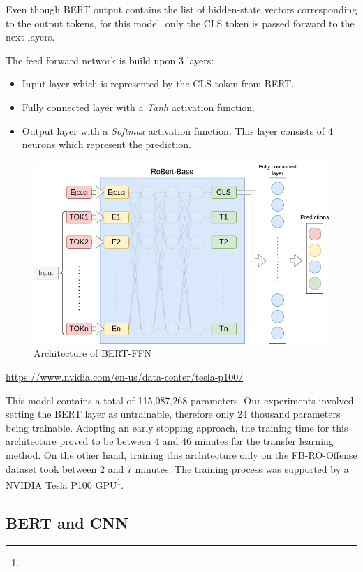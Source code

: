 \documentclass[12pt,a4paper]{report}
\begin{document}
Even though BERT output contains the list of hidden-state vectors corresponding to the output tokens, for this model, only the CLS token is passed forward to the next layers.

The feed forward network is build upon 3 layers:
\begin{itemize}
    \item Input layer which is represented by the CLS token from BERT.
    \item Fully connected layer with a \textit{Tanh} activation function.
    \item Output layer with a \textit{Softmax} activation function. This layer consists of 4 neurons which represent the prediction.
\end{itemize}

\begin{figure}[H]
\centering
\includegraphics[width=15cm]{pics/BERT-FFN.png}
  \caption{Architecture of BERT-FFN}
  \label{fig:BERT-FFN}
\end{figure}

\urldef{\urlNvidia}\url{https://www.nvidia.com/en-us/data-center/tesla-p100/}

This model contains a total of 115,087,268 parameters. Our experiments involved setting the BERT layer as untrainable, therefore only 24 thousand parameters being trainable. Adopting an early stopping approach, the training time for this architecture proved to be between 4 and 46 minutes for the transfer learning method. On the other hand, training this architecture only on the FB-RO-Offense dataset took between 2 and 7 minutes. The training process was supported by a NVIDIA Tesla P100 GPU\footnote{\urlNvidia}.

\subsection{BERT and CNN}
\end{document}
